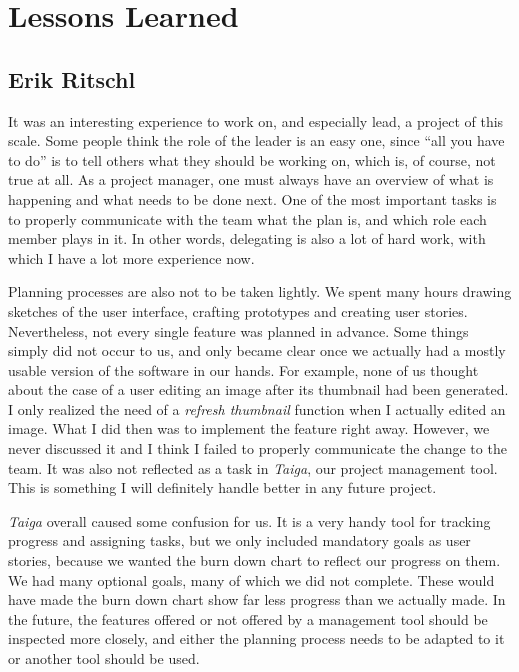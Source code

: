 \section{Lessons Learned}
\def\kapitelautor{}

\subsection{Erik Ritschl}

It was an interesting experience to work on, and especially lead, a project of
this scale. Some people think the role of the leader is an easy one, since ``all you
have to do'' is to tell others what they should be working on, which is, of
course, not true at all. As a project manager, one must always have an overview of
what is happening and what needs to be done next. One of the most important
tasks is to properly communicate with the team what the plan is, and which role
each member plays in it. In other words, delegating is also a lot of hard work,
with which I have a lot more experience now.

Planning processes are also not to be taken lightly. We spent many hours drawing
sketches of the user interface, crafting prototypes and creating user stories.
Nevertheless, not every single feature was planned in advance. Some things
simply did not occur to us, and only became clear once we actually had a
mostly usable version of the software in our hands. For example, none of us
thought about the case of a user editing an image after its thumbnail had
been generated. I only realized the need of a \emph{refresh thumbnail} function
when I actually edited an image. What I did then was to implement the feature
right away. However, we never discussed it and I think I failed to properly
communicate the change to the team. It was also not reflected as a task in
\emph{Taiga}, our project management tool. This is something I will definitely
handle better in any future project.

\emph{Taiga} overall caused some confusion for us. It is a very handy tool for
tracking progress and assigning tasks, but we only included mandatory goals as
user stories, because we wanted the burn down chart to reflect our progress on
them. We had many optional goals, many of which we did not complete. These would
have made the burn down chart show far less progress than we actually made. In
the future, the features offered or not offered by a management tool should be
inspected more closely, and either the planning process needs to be adapted to
it or another tool should be used.

